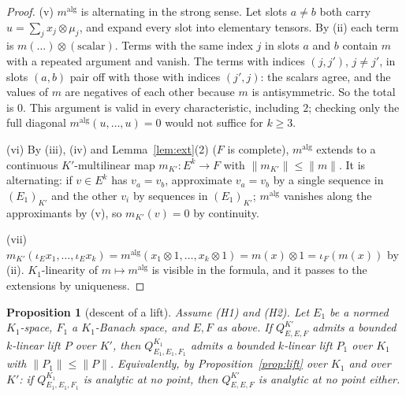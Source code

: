 \documentclass[11pt]{amsart}
\newtheorem{proposition}[theorem]{Proposition}
\theoremstyle{definition}
\theoremstyle{remark}
\numberwithin{equation}{section}
\newcommand{\norm}[1]{\lVert #1\rVert}
\begin{document}
\begin{proof}
\textup{(v)} $m^{\mathrm{alg}}$ is alternating in the strong sense. Let slots $a\ne b$ both carry
$u=\sum_jx_j\otimes\mu_j$, and expand every slot into elementary tensors. By \textup{(ii)} each term is
$m(\dots)\otimes(\text{scalar})$. Terms with the same index $j$ in slots $a$ and $b$ contain $m$ with a repeated
argument and vanish. The terms with indices $(j,j')$, $j\ne j'$, in slots $(a,b)$ pair off with those with indices
$(j',j)$: the scalars agree, and the values of $m$ are negatives of each other because $m$ is antisymmetric. So the total
is $0$. This argument is valid in every characteristic, including $2$; checking only the full diagonal
$m^{\mathrm{alg}}(u,\dots,u)=0$ would not suffice for $k\ge3$.

\textup{(vi)} By \textup{(iii)}, \textup{(iv)} and Lemma~\ref{lem:ext}(2) ($F$ is complete), $m^{\mathrm{alg}}$ extends to a continuous
$K'$\nobreakdash-multilinear map $m_{K'}\colon E^k\to F$ with $\norm{m_{K'}}\le\norm m$. It is alternating: if $v\in E^k$ has
$v_a=v_b$, approximate $v_a=v_b$ by a single sequence in $(E_1)_{K'}$ and the other $v_i$ by sequences in $(E_1)_{K'}$;
$m^{\mathrm{alg}}$ vanishes along the approximants by \textup{(v)}, so $m_{K'}(v)=0$ by continuity.

\textup{(vii)} $m_{K'}(\iota_Ex_1,\dots,\iota_Ex_k)=m^{\mathrm{alg}}(x_1\otimes1,\dots,x_k\otimes1)=m(x)\otimes1=\iota_F(m(x))$ by
\textup{(ii)}. $K_1$\nobreakdash-linearity of $m\mapsto m^{\mathrm{alg}}$ is visible in the formula, and it passes to the extensions by
uniqueness.
\end{proof}

\begin{proposition}[descent of a lift]\label{prop:ascent}
Assume \textup{(H1)} and \textup{(H2)}. Let $E_1$ be a normed $K_1$\nobreakdash-space, $F_1$ a $K_1$\nobreakdash-Banach space, and $E,F$ as
above. If $Q^{K'}_{E,E,F}$ admits a bounded $k$\nobreakdash-linear lift $P$ over $K'$, then $Q^{K_1}_{E_1,E_1,F_1}$ admits a
bounded $k$\nobreakdash-linear lift $P_1$ over $K_1$ with $\norm{P_1}\le\norm P$. Equivalently, by Proposition~\ref{prop:lift} over $K_1$ and over
$K'$: if $Q^{K_1}_{E_1,E_1,F_1}$ is analytic at no point, then $Q^{K'}_{E,E,F}$ is analytic at no point either.
\end{proposition}
\end{document}
